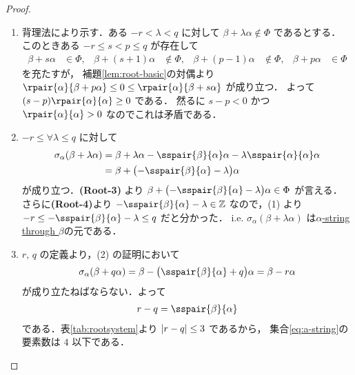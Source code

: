 \documentclass[rep_main]{subfiles}
\begin{document}
\begin{proof}
	\begin{enumerate}
		\item 背理法により示す．ある $-r < \lambda < q$ に対して $\beta + \lambda\alpha \notin \Phi$ であるとする．
		このときある $-r \le s < p \le q$ が存在して
		\begin{align}
			\beta + s\alpha &\in \Phi, & \beta + (s+1)\alpha &\notin \Phi, & \beta + (p-1)\alpha &\notin \Phi, & \beta + p\alpha &\in \Phi
		\end{align}
		を充たすが，
		補題\ref{lem:root-basic}の対偶より $\rpair{\alpha}{\beta + p\alpha} \le 0 \le \rpair{\alpha}{\beta + s\alpha}$ が成り立つ．
		よって $(s-p) \rpair{\alpha}{\alpha} \ge 0$ である．
		然るに $s-p < 0$ かつ $\rpair{\alpha}{\alpha} > 0$ なのでこれは矛盾である．
		\item $-r \le \forall \lambda \le q$ に対して
		\begin{align}
			\sigma_\alpha(\beta + \lambda\alpha) 
			&= \beta + \lambda\alpha - \sspair{\beta}{\alpha}\alpha - \lambda \sspair{\alpha}{\alpha}\alpha \\
			&= \beta + \bigl( - \sspair{\beta}{\alpha} - \lambda \bigr) \alpha
		\end{align}
		が成り立つ．\textsf{\textbf{(Root-3)}} より $\beta + \bigl( - \sspair{\beta}{\alpha} - \lambda \bigr) \alpha \in \Phi$ が言える．
		さらに\textsf{\textbf{(Root-4)}}より $- \sspair{\beta}{\alpha} - \lambda \in \mathbb{Z}$ なので，(1) より $-r \le -\sspair{\beta}{\alpha} - \lambda \le q$ だと分かった．
		i.e. $\sigma_\alpha(\beta + \lambda\alpha)$ は\hyperref[def:a-sting]{$\alpha$-string through $\beta$}の元である．
		\item $r,\, q$ の定義より，(2) の証明において
		\begin{align}
			\sigma_\alpha(\beta + q\alpha) = \beta - \bigl( \sspair{\beta}{\alpha} + q \bigr) \alpha = \beta - r \alpha
		\end{align}
		が成り立たねばならない．よって
		\begin{align}
			r-q = \sspair{\beta}{\alpha}
		\end{align}
		である．表\ref{tab:rootsystem}より $\abs{r-q} \le 3$ であるから， 集合\eqref{eq:a-string}の要素数は $4$ 以下である．
	\end{enumerate}
	
\end{proof}
\end{document}
